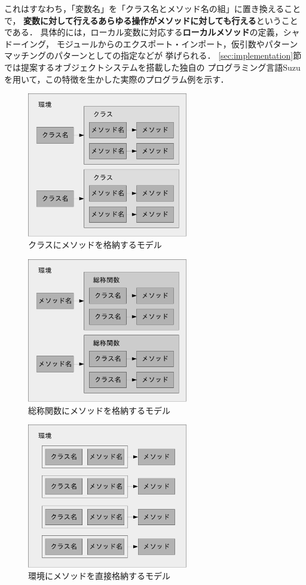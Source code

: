 \documentclass{ipsjprosym}
\begin{document}
これはすなわち，「変数名」を「クラス名とメソッド名の組」に置き換えることで，
\textbf{変数に対して行えるあらゆる操作がメソッドに対しても行える}ということである．
具体的には，ローカル変数に対応する\textbf{ローカルメソッド}の定義，シャドーイング，
モジュールからのエクスポート・インポート，仮引数やパターンマッチングのパターンとしての指定などが
挙げられる．
\ref{sec:implementation}節では提案するオブジェクトシステムを搭載した独自の
プログラミング言語Suzuを用いて，この特徴を生かした実際のプログラム例を示す．

\begin{figure}
\centering
\includegraphics[width=7cm]{fig/classes-crop.pdf}
\caption{クラスにメソッドを格納するモデル}
\label{fig:classes}
\end{figure}

\begin{figure}
\centering
\includegraphics[width=7cm]{fig/generic-functions-crop.pdf}
\caption{総称関数にメソッドを格納するモデル}
\label{fig:generic-functions}
\end{figure}

\begin{figure}
\centering
\includegraphics[width=7cm]{fig/environment-crop.pdf}
\caption{環境にメソッドを直接格納するモデル}
\label{fig:environment}
\end{figure}
\end{document}
